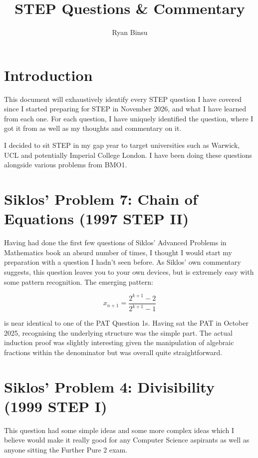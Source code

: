 \documentclass[11pt,a4paper]{article}
\title{STEP Questions \& Commentary}
\author{Ryan Binsu}
\begin{document}
\maketitle

\cleardoublepage

\section{Introduction}
This document will exhaustively identify every STEP question I have covered since I started preparing for STEP in November 2026, and what I have learned from each one.
 For each question, I have uniquely identified the question, where I got it from as well as my thoughts and commentary on it.

I decided to sit STEP in my gap year to target universities such as Warwick, UCL and potentially Imperial College London.
 I have been doing these questions alongside various problems from BMO1.

\section{Siklos' Problem 7: Chain of Equations (1997 STEP II)}
Having had done the first few questions of Siklos' Advanced Problems in Mathematics book an absurd number of times,
I thought I would start my preparation with a question I hadn't seen before. As Siklos' own commentary suggests, this question leaves you to your own devices, 
but is extremely easy with some pattern recognition. The emerging pattern: 

\[
    x_{n+1} = \frac{2^{k+1} - 2}{2^{k+1} - 1}
\]

\noindent is near identical to one of the PAT Question 1s. Having sat the PAT in October 2025, recognising the underlying structure was the simple part. The actual induction proof was slightly interesting
 given the manipulation of algebraic fractions within the denominator but was overall quite straightforward.

\section{Siklos' Problem 4: Divisibility (1999 STEP I)}
This question had some simple ideas and some more complex ideas which I believe would make it really good for any Computer Science aspirants as well as anyone sitting the Further Pure 2 exam.
\end{document}
